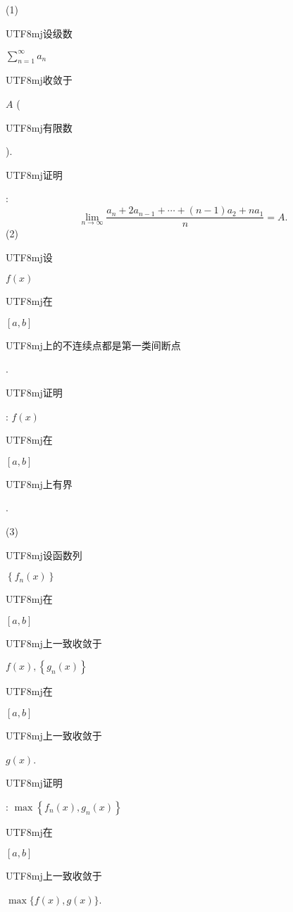 \documentclass[10pt]{article}
\begin{document}
(1) \begin{CJK}{UTF8}{mj}设级数\end{CJK} $\sum_{n=1}^{\infty} a_{n}$ \begin{CJK}{UTF8}{mj}收敛于\end{CJK} $A$ (\begin{CJK}{UTF8}{mj}有限数\end{CJK}). \begin{CJK}{UTF8}{mj}证明\end{CJK}:
$$
\lim _{n \rightarrow \infty} \frac{a_{n}+2 a_{n-1}+\cdots+(n-1) a_{2}+n a_{1}}{n}=A .
$$
(2) \begin{CJK}{UTF8}{mj}设\end{CJK} $f(x)$ \begin{CJK}{UTF8}{mj}在\end{CJK} $[a, b]$ \begin{CJK}{UTF8}{mj}上的不连续点都是第一类间断点\end{CJK}. \begin{CJK}{UTF8}{mj}证明\end{CJK}: $f(x)$ \begin{CJK}{UTF8}{mj}在\end{CJK} $[a, b]$ \begin{CJK}{UTF8}{mj}上有界\end{CJK}.

(3) \begin{CJK}{UTF8}{mj}设函数列\end{CJK} $\left\{f_{n}(x)\right\}$ \begin{CJK}{UTF8}{mj}在\end{CJK} $[a, b]$ \begin{CJK}{UTF8}{mj}上一致收敛于\end{CJK} $f(x),\left\{g_{n}(x)\right\}$ \begin{CJK}{UTF8}{mj}在\end{CJK} $[a, b]$ \begin{CJK}{UTF8}{mj}上一致收敛于\end{CJK} $g(x)$. \begin{CJK}{UTF8}{mj}证明\end{CJK}: $\max \left\{f_{n}(x), g_{n}(x)\right\}$ \begin{CJK}{UTF8}{mj}在\end{CJK} $[a, b]$ \begin{CJK}{UTF8}{mj}上一致收敛于\end{CJK} $\max \{f(x), g(x)\}$.
\end{document}
